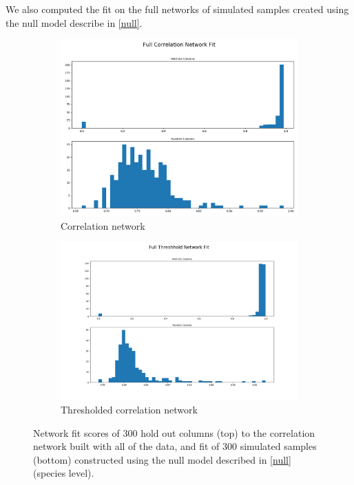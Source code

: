 \documentclass[10pt]{article}
\theoremstyle{definition}
\numberwithin{theorem}{section}
\numberwithin{definition}{section}
\numberwithin{lemma}{section}
\numberwithin{corollary}{section}
\numberwithin{clm}{section}
\numberwithin{rmk}{section}
\begin{document}
We also computed the fit on the full networks of simulated samples created using the null model describe in \cref{null}.

\begin{figure}
	\begin{subfigure}[h]{0.9\textwidth}
	\begin{center}
	\includegraphics[scale = 0.4]{../fit_histo_cor.png}
	\end{center}
\caption{Correlation network}
	\end{subfigure}
	\begin{subfigure}[h]{0.9\textwidth}
	\begin{center}
		\includegraphics[scale = 0.4]{../fit_histo_thr.png}
	\end{center}
	\caption{Thresholded correlation network}
\end{subfigure}
	\caption{Network fit scores of 300 hold out columns (top) to the correlation network built with all of the data, and fit of 300 simulated samples (bottom) constructed using the null model described in \cref{null} (species level).}
\end{figure} 
\end{document}
